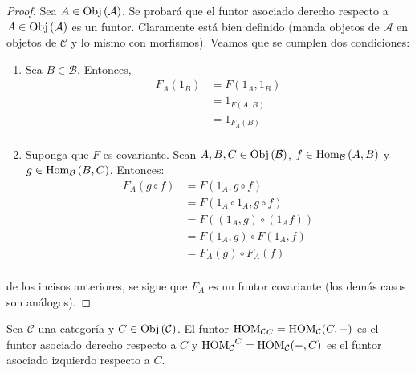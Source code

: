 \documentclass[12pt]{report}
\theoremstyle{largebreak}
\newcommand{\Obj}[1]{\ensuremath{\textup{Obj}\left(#1\right)}}
\newcommand{\Hom}[3]{\ensuremath{\textup{Hom}_{#1}\left(#2,#3\right)}}
\begin{document}
    \begin{proof}
        Sea $A\in\Obj{\mathcal{A}}$. Se probará que el funtor asociado derecho respecto a $A\in\Obj{\mathcal{A}}$ es un funtor. Claramente está bien definido (manda objetos de $\mathcal{A}$ en objetos de $\mathcal{C}$ y lo mismo con morfismos). Veamos que se cumplen dos condiciones:
        \begin{enumerate}
            \item Sea $B\in\mathcal{B}$. Entonces,
            \begin{equation*}
                \begin{split}
                    F_A(1_B)&=F(1_A,1_B)\\
                    &=1_{F(A,B)}\\
                    &=1_{F_A(B)}\\
                \end{split}
            \end{equation*}
            \item Suponga que $F$ es covariante. Sean $A,B,C\in\Obj{\mathcal{B}}$, $f\in\Hom{\mathcal{B}}{A}{B}$ y $g\in\Hom{\mathcal{B}}{B}{C}$. Entonces:
            \begin{equation*}
                \begin{split}
                    F_A(g\circ f)&=F(1_A,g\circ f)\\
                    &=F(1_A\circ 1_A,g\circ f)\\
                    &=F((1_A,g)\circ(1_A f))\\
                    &=F(1_A,g)\circ F(1_A,f)\\
                    &=F_A(g)\circ F_A(f)\\
                \end{split}
            \end{equation*}
        \end{enumerate}
        de los incisos anteriores, se sigue que $F_A$ es un funtor covariante (los demás casos son análogos).
    \end{proof}

    \begin{exa}
        Sea $\mathcal{C}$ una categoría  y $C\in\Obj{\mathcal{C}}$. El funtor ${\textup{HOM}_{\mathcal{C}}}_C=\textup{HOM}_{\mathcal{C}}(C,-)$ es el funtor asociado derecho respecto a $C$ y ${\textup{HOM}_{\mathcal{C}}}^C=\textup{HOM}_{\mathcal{C}}(-,C)$ es el funtor asociado izquierdo respecto a $C$.
    \end{exa}
\end{document}
